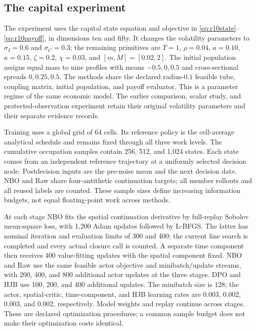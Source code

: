 \subsection{The capital experiment}
\label{sec:r15experimentdesign}
The experiment uses the capital state equation and objective in
\eqref{eq:r10state}--\eqref{eq:r10payoff}, in dimensions ten and fifty.
It changes the volatility parameters to $\sigma_I=0.6$ and $\sigma_C=0.3$;
the remaining primitives are $T=1$, $\rho=0.04$, $a=0.10$,
$\kappa=0.15$, $\zeta=0.2$, $\chi=0.03$, and
$[\underline m,M]=[0.02,2]$. The initial population assigns equal mass to
nine profiles with means $-0.5,0,0.5$ and cross-sectional spreads
$0,0.25,0.5$. The methods share the declared radius-$0.1$ feasible tube,
coupling matrix, initial population, and payoff evaluator. This is a
parameter regime of the same economic model. The earlier comparison,
scalar study, and protected-observation experiment retain their original
volatility parameters and their separate evidence records.

Training uses a global grid of 64 cells. Its reference policy is the
cell-average analytical schedule and remains fixed through all three
work levels. The cumulative occupation samples contain 256, 512, and
1,024 states. Each state comes from an independent reference trajectory
at a uniformly selected decision node. Postdecision inputs are the
pre-noise mean and the next decision date. NBO and Raw share four-antithetic
continuation targets; all member rollouts and all reused labels are
counted. These sample sizes define increasing information budgets,
not equal floating-point work across methods.

At each stage NBO fits the spatial continuation derivative by full-replay
Sobolev mean-square loss, with 1,200 Adam updates followed by L-BFGS.
The latter has nominal iteration and evaluation limits of 300 and 400;
the current line search is completed and every actual closure call is counted.
A separate time component then receives 400 value-fitting updates with
the spatial component fixed. NBO and Raw use the same feasible actor
objective and minibatch/update streams, with 200, 400, and 800 additional
actor updates at the three stages. DPO and HJB use 100, 200, and 400
additional updates. The minibatch size is 128; the actor, spatial-critic,
time-component, and HJB learning rates are $0.003$, $0.002$, $0.003$,
and $0.002$, respectively. Model weights and replay continue across
stages. These are declared optimization procedures; a common sample
budget does not make their optimization costs identical.

